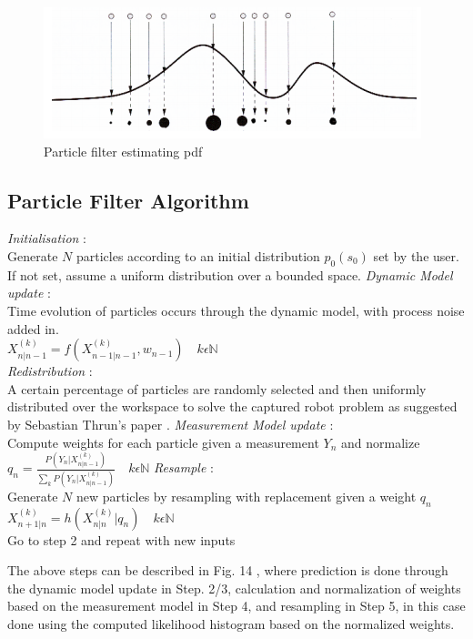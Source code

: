 \documentclass[15pt]{article}
\begin{document}
\begin{figure}[h!]
  \centering
  \includegraphics[scale=0.3]{particles}
  \captionsetup{justification=centering}
  \caption{Particle filter estimating pdf}
\end{figure}

\subsection{Particle Filter Algorithm}
\begin{algorithmic}[1]
\STATE \textit{Initialisation} : \\
Generate $N$ particles according to an initial distribution $p_{0}(s_{0})$ set by the user. If not set, assume a uniform distribution over a bounded space.
\STATE \textit{Dynamic Model update} : \\
Time evolution of particles occurs through the dynamic model, with process noise added in.\\
$X_{n|n-1}^{(k)}=f(X_{n-1|n-1}^{(k)},w_{n-1})\quad k\epsilon\mathbb{N}$\\
\STATE \textit{Redistribution} : \\
A certain percentage of particles are randomly selected and then uniformly distributed over the workspace to solve the captured robot problem as suggested by Sebastian Thrun's paper \cite{Fox1999}.
\STATE \textit{Measurement Model update} : \\
Compute weights for each particle given a measurement $Y_{n}$ and normalize \\
$q_{n}=\frac{P(Y_{n}|X_{n|n-1}^{(k)})}{\sum_{k}P(Y_{n}|X_{n|n-1}^{(k)})}\quad k\epsilon\mathbb{N}$
\STATE \textit{Resample} : \\
Generate $N$ new particles by resampling with replacement given a weight $q_{n}$ \\
$X_{n+1|n}^{(k)}=h(X_{n|n}^{(k)}|q_{n})\quad k\epsilon\mathbb{N}$ \\
\STATE Go to step 2 and repeat with new inputs
\end{algorithmic} 

The above steps can be described in Fig. 14 \cite{PFDemo}, where prediction is done through the dynamic model update in Step. 2/3, calculation and normalization of weights based on the measurement model in Step 4, and resampling in Step 5, in this case done using the computed likelihood histogram based on the normalized weights.
\end{document}
